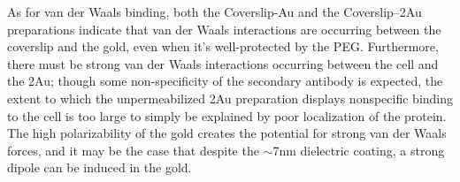 As for van der Waals binding, both the Coverslip-Au and the Coverslip--2Au preparations indicate that van der Waals interactions are occurring between the coverslip and the gold, even when it's well-protected by the PEG. Furthermore, there must be strong van der Waals interactions occurring between the cell and the 2Au; though some non-specificity of the secondary antibody is expected, the extent to which the unpermeabilized 2Au preparation displays nonspecific binding to the cell is too large to simply be explained by poor localization of the protein. The high polarizability of the gold creates the potential for strong van der Waals forces, and it may be the case that despite the \ensuremath{\sim}7nm dielectric coating, a strong dipole can be induced in the gold.
